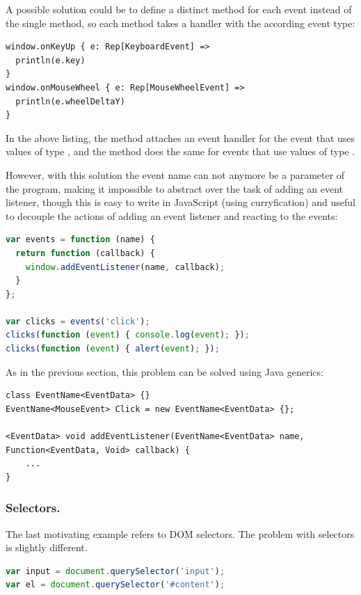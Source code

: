 \documentclass[runningheads,a4paper]{llncs}
\begin{document}
A possible solution could be to define a distinct method for each event instead of the single
 method, so each method takes a handler with the according event type:

\begin{lstlisting}
window.onKeyUp { e: Rep[KeyboardEvent] =>
  println(e.key)
}
window.onMouseWheel { e: Rep[MouseWheelEvent] =>
  println(e.wheelDeltaY)
}
\end{lstlisting}

In the above listing, the  method attaches an event handler for the  event
that uses values of type , and the  method does the same for
 events that use values of type .

However, with this solution the event name can not anymore be a parameter of the program, making it
impossible to abstract over the task of adding an event listener, though this is easy to write in
JavaScript (using curryfication) and useful to decouple the actions of adding an event
listener and reacting to the events:

\begin{lstlisting}[language=JavaScript,label=react-js]
var events = function (name) {
  return function (callback) {
    window.addEventListener(name, callback);
  }
};

var clicks = events('click');
clicks(function (event) { console.log(event); });
clicks(function (event) { alert(event); });
\end{lstlisting}

As in the previous section, this problem can be solved using Java generics:

\begin{lstlisting}
class EventName<EventData> {}
EventName<MouseEvent> Click = new EventName<EventData> {};

<EventData> void addEventListener(EventName<EventData> name, Function<EventData, Void> callback) {
    ...
}
\end{lstlisting}


\subsubsection{Selectors.}

The last motivating example refers to DOM selectors. The problem with selectors is slightly different.

\begin{lstlisting}[language=JavaScript]
var input = document.querySelector('input');
var el = document.querySelector('#content');
\end{lstlisting}
\end{document}
